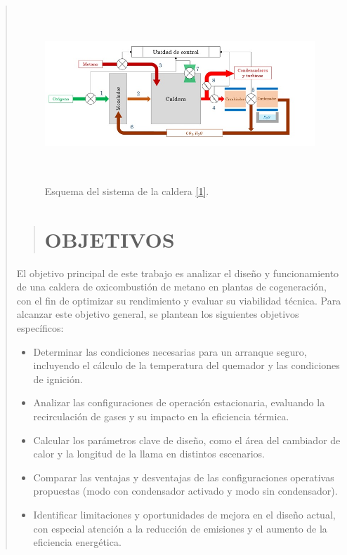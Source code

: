 \documentclass[11pt, a4paper]{article}
\begin{document}
\begin{quote}
\begin{center}
\begin{adjustwidth}{-1.7cm}{-1cm}
\begin{figure}[h!]
\centering
 \includegraphics[width=6.86625209424in, height=2.60805199507in]{media/caldera.jpg}
\caption{Esquema del sistema de la caldera  \protect\hyperlink{bibliografia}{{[}1{]}}.}
\label{fig:caldera}
\end{figure}


\newpage

\begin{quote}
\setlength{\parskip}{1pt} %
\vspace*{0.3cm} %
\hypertarget{objetivos}{%
\section{OBJETIVOS}\label{objetivos}}
\end{quote}
\vspace*{1cm} %


El objetivo principal de este trabajo es analizar el diseño y funcionamiento de una caldera de oxicombustión de metano en plantas de cogeneración, con el fin de optimizar su rendimiento y evaluar su viabilidad técnica. Para alcanzar este objetivo general, se plantean los siguientes objetivos específicos:

\begin{itemize}
    \item Determinar las condiciones necesarias para un arranque seguro, incluyendo el cálculo de la temperatura del quemador y las condiciones de ignición.
    \item Analizar las configuraciones de operación estacionaria, evaluando la recirculación de gases y su impacto en la eficiencia térmica.
    \item Calcular los parámetros clave de diseño, como el área del cambiador de calor y la longitud de la llama en distintos escenarios.
    \item Comparar las ventajas y desventajas de las configuraciones operativas propuestas (modo con condensador activado y modo sin condensador).
    \item Identificar limitaciones y oportunidades de mejora en el diseño actual, con especial atención a la reducción de emisiones y el aumento de la eficiencia energética.
\end{itemize}


\end{adjustwidth}
\end{center}
\end{quote}
\end{document}
